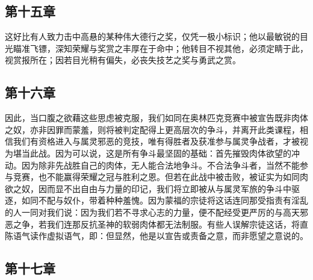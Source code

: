 
\subsection{第十五章}

\par

这好比有人致力击中高悬的某种伟大德行之奖，仅凭一极小标识；他以最敏锐的目光瞄准飞镖，深知荣耀与奖赏之丰厚在于命中；他转目不视其他，必须定睛于此，视赏报所在；因若目光稍有偏失，必丧失技艺之奖与勇武之赏。\par


\subsection{第十六章}

\par

因此，当口腹之欲藉这些思虑被克服，我们如同在奥林匹克竞赛中被宣告既非肉体之奴，亦非因罪而蒙羞，则将被判定配得上更高层次的争斗，并离开此类课程，相信我们有资格进入与属灵邪恶的竞技，唯有得胜者及获准参与属灵争战者，才被视为堪当此战。因为可以说，这是所有争斗最坚固的基础：首先摧毁肉体欲望的冲动。因为除非先战胜自己的肉体，无人能合法地争斗。不合法争斗者，当然不能参与竞赛，也不能赢得荣耀之冠与胜利之恩。但若在此战中被击败，被证实为如同肉欲之奴，因而显不出自由与力量的印记，我们将立即被从与属灵军旅的争斗中驱逐，如同不配与奴仆，带着种种羞愧。因为蒙福的宗徒将这话连同那受指责有淫乱的人一同对我们说：因为我们若不寻求心志的力量，便不配经受更严厉的与高天邪恶之争，若我们连那反抗圣神的软弱肉体都无法制服。有些人误解宗徒这话，将直陈语气读作虚拟语气，即：但显然，他是以宣告或责备之意，而非愿望之意说的。\par


\subsection{第十七章}

